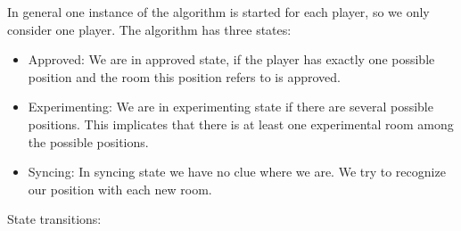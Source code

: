 \documentclass[11pt]{article}
\begin{document}
In general one instance of the algorithm is started for each player, so we only consider one
player. The algorithm has three states:
\begin{itemize}
\item{Approved:} We are in approved state, if the player has exactly one possible position and the
room this position refers to is approved.
\item{Experimenting:} We are in experimenting state if there are several possible positions. This
implicates that there is at least one experimental room among the possible positions.  
\item{Syncing:} In syncing state we have no clue where we are. We try to recognize our position
with each new room.
\end{itemize}


State transitions:
\end{document}
